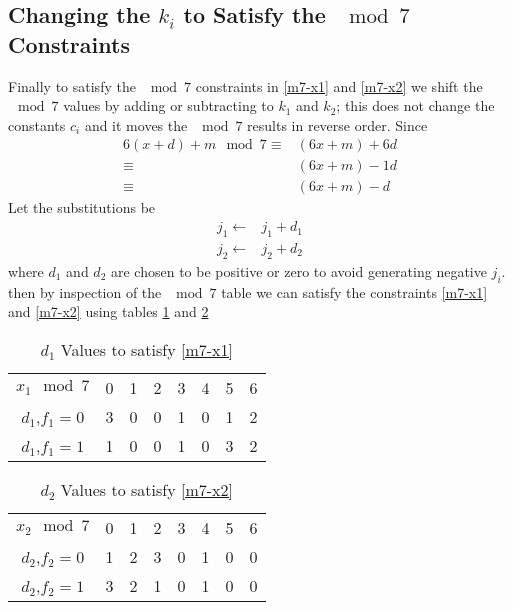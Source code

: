 \documentclass[a4paper,oneside,english]{article}
\numberwithin{equation}{section}
\numberwithin{figure}{section}
\numberwithin{table}{section}
\begin{document}
\subsection{Changing the $k_i$ to Satisfy the $\mod 7$ Constraints}
Finally to satisfy the $\mod 7$ constraints in \ref{m7-x1} and  \ref{m7-x2} we shift the $\mod 7$ values by adding or subtracting to $k_1$ and $k_2$; this does not change the constants $c_i$ and it moves the $\mod 7$ results in reverse order. Since 
\begin{align}
6(x+d)+m \mod 7 \equiv &(6x+m) +6d \\
\equiv & (6x+m) -1d\\
\equiv & (6x+m) -d
\end{align} 
Let the substitutions be 
\begin{align}
j_1 \leftarrow & j_1+d_1\\
j_2 \leftarrow & j_2+d_2
\end{align}
where $d_1$ and $d_2$ are chosen to be positive or zero to avoid generating negative $j_i$.
then by inspection of the $\mod 7$ table we can satisfy the constraints  \ref{m7-x1} and \ref{m7-x2} using tables \ref{d-values1} and \ref{d-values2}
\begin{table}[h] 	\caption{\label{d-values1} $d_1$ Values to satisfy \ref{m7-x1}  }
	\begin{center}
		\begin{tabular}{|c||ccccccc|}
			\hline
			$x_1 \mod 7$ &0 &1 &2 &3 &4 &5 &6 \\
			$d_1$,$f_1=0$&3 &0 &0 &1 &0 &1 &2\\
			$d_1$,$f_1=1$&1 &0 &0 &1 &0 &3 &2\\
			\hline
		\end{tabular}
	\end{center}
\end{table} 

\begin{table}[h] 	\caption{\label{d-values2} $d_2$ Values to satisfy \ref{m7-x2}  }
	\begin{center}
		\begin{tabular}{|c||ccccccc|}
			\hline
			$x_2 \mod 7$ &0 &1 &2 &3 &4 &5 &6 \\
			$d_2$,$f_2=0$&1 &2 &3 &0 &1 &0 &0\\
			$d_2$,$f_2=1$&3 &2 &1 &0 &1 &0 &0\\
			\hline
		\end{tabular}
	\end{center}
\end{table} 



 
\end{document}
